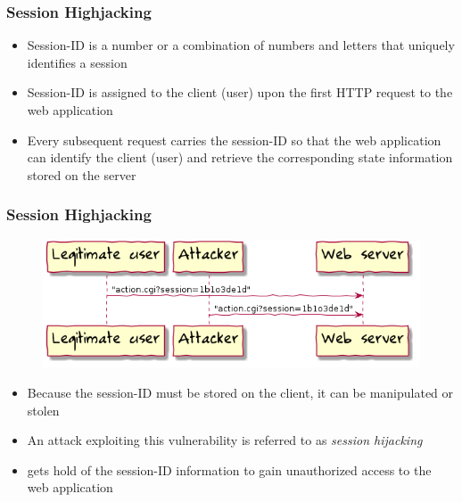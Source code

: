 \begin{frame}
    \frametitle{Session Highjacking}
    \begin{itemize}
        \item Session-ID is a number or a combination of numbers and letters that uniquely identifies a session
        \item Session-ID is assigned to the client (user) upon the first HTTP request to the web application
        \item Every subsequent request carries the session-ID so that the web application can identify the client (user) and retrieve the corresponding state information stored on the server
    \end{itemize}
\end{frame}

\begin{frame}
    \frametitle{Session Highjacking}
    \begin{figure}[htb]
        \centering
        \includegraphics[scale=.5]{uml/session-hijacking.png}
    \end{figure}
    \begin{itemize}
        \item Because the session-ID must be stored on the client, it can be manipulated or stolen
        \item An attack exploiting this vulnerability is referred to as \emph{session hijacking}
        \item \Attacker gets hold of the session-ID information to gain unauthorized access to the web application
    \end{itemize}
\end{frame}

